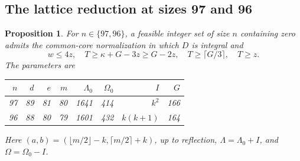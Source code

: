\documentclass[11pt,a4paper]{article}
\newtheorem{proposition}[theorem]{Proposition}
\theoremstyle{remark}
\begin{document}
\subsection{The lattice reduction at sizes 97 and 96}
\begin{proposition}\label{u96:prop:lattice96}
For $n\in\{97,96\}$, a feasible integer set of size $n$ containing zero
admits the common-core normalization in which $D$ is integral and
\[
 w\leq4z,\quad T\geq\kappa+G-3z\geq G-2z,
 \quad T\geq\lceil G/3\rceil,\quad T\geq z.
\]
The parameters are
\begin{center}
\begin{tabular}{rrrrrrrr}
\toprule
$n$&$d$&$e$&$m$&$\Lambda_0$&$\Omega_0$&$I$&$G$\\\midrule
97&89&81&80&1641&414&$k^2$&166\\
96&88&80&79&1601&432&$k(k+1)$&164\\\bottomrule
\end{tabular}
\end{center}
Here $(a,b)=(\lfloor m/2\rfloor-k,\lceil m/2\rceil+k)$, up to reflection,
$\Lambda=\Lambda_0+I$, and $\Omega=\Omega_0-I$.
\end{proposition}
\end{document}
